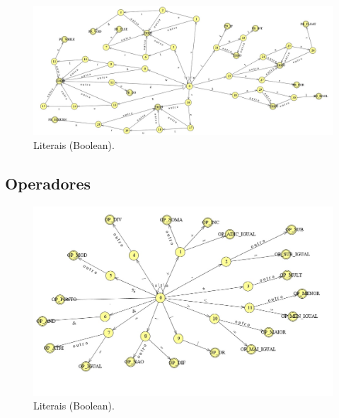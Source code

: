 \documentclass{article}
\begin{document}
\begin{figure}[!h]
\centering
\includegraphics[width=15cm]{DT_PALAVRAS_RESERV.jpg}
\caption{Literais (Boolean).}
\label{fig:CL_logo}\end{figure}

\pagebreak

\subsection{Operadores}

\begin{figure}[!h]
\centering
\includegraphics[width=15cm]{DT_OPERADORES.jpg}
\caption{Literais (Boolean).}
\label{fig:CL_logo}\end{figure}
\end{document}
